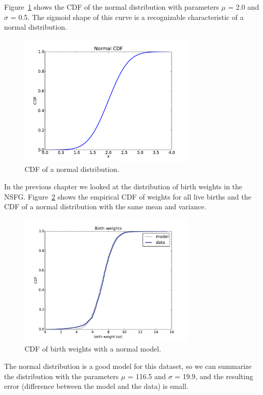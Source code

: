 \documentclass[12pt]{book}
\begin{document}
Figure~\ref{normal_cdf} shows the CDF of the normal distribution
with parameters $\mu$ = 2.0 and $\sigma$ = 0.5.  The sigmoid shape of
this curve is a recognizable characteristic of a normal distribution.

\begin{figure}
\centerline{\includegraphics[height=2.5in]{figs/normal_cdf.pdf}}
\caption{CDF of a normal distribution.}
\label{normal_cdf}
\end{figure}

In the previous chapter we looked at the distribution of birth
weights in the NSFG.  Figure~\ref{nsfg_birthwgt_model} shows the
empirical CDF of weights for all live births and the CDF of
a normal distribution with the same mean and variance.

\begin{figure}
\centerline{\includegraphics[height=2.5in]{figs/nsfg_birthwgt_model.pdf}}
\caption{CDF of birth weights with a normal model.}
\label{nsfg_birthwgt_model}
\end{figure}

The normal distribution is a good model for this dataset, so
we can summarize the distribution with the parameters
$\mu$ = 116.5 and $\sigma$ = 19.9, and the resulting error
(difference between the model and the data) is small.
\end{document}
